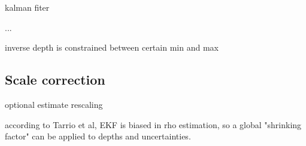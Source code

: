  kalman fiter

 ...

 inverse depth is constrained between certain min and max

\subsection{Scale correction}


 optional estimate rescaling

 according to Tarrio et al, EKF is biased in rho estimation, so a global "shrinking factor" can be applied to depths and uncertainties.









